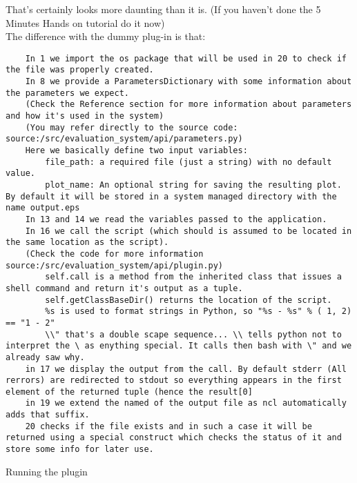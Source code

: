 \documentclass[a4paper,11pt]{ltxdoc}
\begin{document}
That's certainly looks more daunting than it is. (If you haven't done the 5 Minutes Hands on tutorial do it now)\\
The difference with the dummy plug-in is that:
\begin{verbatim}
    In 1 we import the os package that will be used in 20 to check if the file was properly created.
    In 8 we provide a ParametersDictionary with some information about the parameters we expect.
    (Check the Reference section for more information about parameters and how it's used in the system)
    (You may refer directly to the source code: source:/src/evaluation_system/api/parameters.py)
    Here we basically define two input variables:
        file_path: a required file (just a string) with no default value.
        plot_name: An optional string for saving the resulting plot. By default it will be stored in a system managed directory with the name output.eps
    In 13 and 14 we read the variables passed to the application.
    In 16 we call the script (which should is assumed to be located in the same location as the script).
    (Check the code for more information source:/src/evaluation_system/api/plugin.py)
        self.call is a method from the inherited class that issues a shell command and return it's output as a tuple.
        self.getClassBaseDir() returns the location of the script.
        %s is used to format strings in Python, so "%s - %s" % ( 1, 2) == "1 - 2"
        \\" that's a double scape sequence... \\ tells python not to interpret the \ as enything special. It calls then bash with \" and we already saw why.
    in 17 we display the output from the call. By default stderr (All rerrors) are redirected to stdout so everything appears in the first element of the returned tuple (hence the result[0]
    in 19 we extend the named of the output file as ncl automatically adds that suffix.
    20 checks if the file exists and in such a case it will be returned using a special construct which checks the status of it and store some info for later use.
\end{verbatim}

Running the plugin
\end{document}
